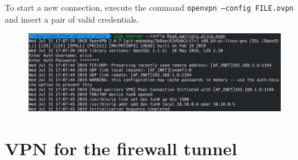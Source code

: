 \documentclass{homework}
\begin{document}
    To start a new connection, execute the command \texttt{openvpn --config FILE.ovpn} and insert a pair of valid credentials.
    \begin{figure}[H]
        \centering
        \includegraphics[width=\linewidth]{openvpn/client}
        \label{fig:openvpn-client}
    \end{figure}
    
    
    \section{VPN for the firewall tunnel}
\end{document}
